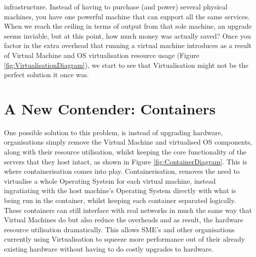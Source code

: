 infrastructure. Instead of having to purchase (and power) several physical machines, you have one powerful machine that can support all the same services. When we reach the ceiling in terms of output from that sole machine, an upgrade seems inviable, but at this point, how much money was actually saved? Once you factor in the extra overhead that running a virtual machine introduces as a result of Virtual Machine and OS virtualisation resource usage (Figure \ref{fig:VirtualisationDiagram}), we start to see that Virtualisation might not be the perfect solution it once was.



\section{A New Contender: Containers}
\label{IntroContainer}
One possible solution to this problem, is instead of upgrading hardware, organisations simply remove the Virtual Machine and virtualised OS components, along with their resource utilisation, whilst keeping the core functionality of the servers that they host intact, as shown in Figure \ref{fig:ContainerDiagram}. This is where containerisation comes into play. Containerisation, removes the need to virtualise a whole Operating System for each virtual machine, instead ingratiating with the host machine's Operating System directly with what is being run in the container, whilst keeping each container separated logically. These containers can still interface with real networks in much the same way that Virtual Machines do but also reduce the overheads and as result, the hardware resource utilisation dramatically. This allows SME's and other organisations currently using Virtualisation to squeeze more performance out of their already existing hardware without having to do costly upgrades to hardware.


